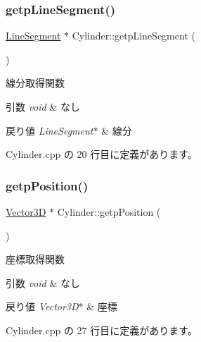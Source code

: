 \subsubsection{\texorpdfstring{getp\+Line\+Segment()}{getpLineSegment()}}
{\footnotesize\ttfamily \mbox{\hyperlink{class_line_segment}{Line\+Segment}} $\ast$ Cylinder\+::getp\+Line\+Segment (\begin{DoxyParamCaption}{ }\end{DoxyParamCaption})}



線分取得関数 


\begin{DoxyParams}{引数}
{\em void} & なし \\
\hline
\end{DoxyParams}

\begin{DoxyRetVals}{戻り値}
{\em Line\+Segment$\ast$} & 線分 \\
\hline
\end{DoxyRetVals}


 Cylinder.\+cpp の 20 行目に定義があります。

\mbox{\label{class_cylinder_abf7bd0ec7c85488de892601bc9e23e94}} 
\subsubsection{\texorpdfstring{getp\+Position()}{getpPosition()}}
{\footnotesize\ttfamily \mbox{\hyperlink{class_vector3_d}{Vector3D}} $\ast$ Cylinder\+::getp\+Position (\begin{DoxyParamCaption}{ }\end{DoxyParamCaption})}



座標取得関数 


\begin{DoxyParams}{引数}
{\em void} & なし \\
\hline
\end{DoxyParams}

\begin{DoxyRetVals}{戻り値}
{\em Vector3\+D$\ast$} & 座標 \\
\hline
\end{DoxyRetVals}


 Cylinder.\+cpp の 27 行目に定義があります。

